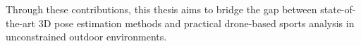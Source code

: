 Through these contributions, this thesis aims to bridge the gap between state-of-the-art 3D pose estimation methods and practical drone-based sports analysis in unconstrained outdoor environments.


